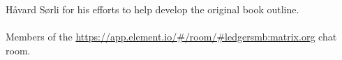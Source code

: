 H{\aa}vard S{\o}rli for his efforts to help develop the original book outline.\\
~ \\
Members of the \url{https://app.element.io/#/room/#ledgersmb:matrix.org}  chat room.










\clearpage
{}
\printglossary[type=acronym]

\clearpage
{}
\printglossary[title={Definition of terms}]

\clearpage
{}
\printindex



